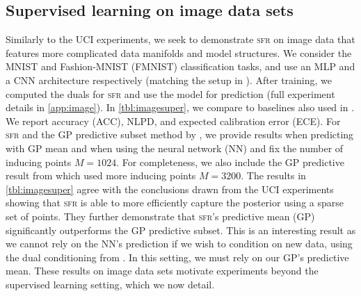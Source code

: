 \documentclass{article}
\newcommand{\our}{\textsc{sfr}\xspace}
\begin{document}
\subsection{Supervised learning on image data sets}
\label{sec:image}
Similarly to the UCI experiments, we seek to demonstrate \our on image data that features more complicated data manifolds and model structures.
We consider the MNIST and Fashion-MNIST (FMNIST) classification tasks, and use an MLP and a CNN architecture respectively (matching the setup in \cite{immer2021improving}).
After training, we computed the duals for \our and use the model for prediction (full experiment details in \cref{app:image}).
In \cref{tbl:imagesuper}, we compare to baselines also used in \cite{immer2021improving}.
We report accuracy (ACC), NLPD, and expected calibration error (ECE).
For \our and the GP predictive subset method by \cite{immer2021improving}, we provide results when predicting with GP mean and when using the neural network (NN) and
fix the number of inducing points $M=1024$.
For completeness, we also include the GP predictive result from \cite{immer2021improving} which used more inducing points $M=3200$.
The results in \cref{tbl:imagesuper} agree with the conclusions drawn from the UCI experiments showing that \our is able to more efficiently capture the posterior using a sparse set of points.
They further demonstrate that \our's predictive mean (GP) significantly outperforms the GP predictive subset.
This is an interesting result as we cannot rely on the NN's prediction if we wish to condition on new data, using the dual conditioning from \label{sec:sequential}.
In this setting, we must rely on our GP's predictive mean.
These results on image data sets motivate experiments beyond the supervised learning setting, which we now detail.





\end{document}
